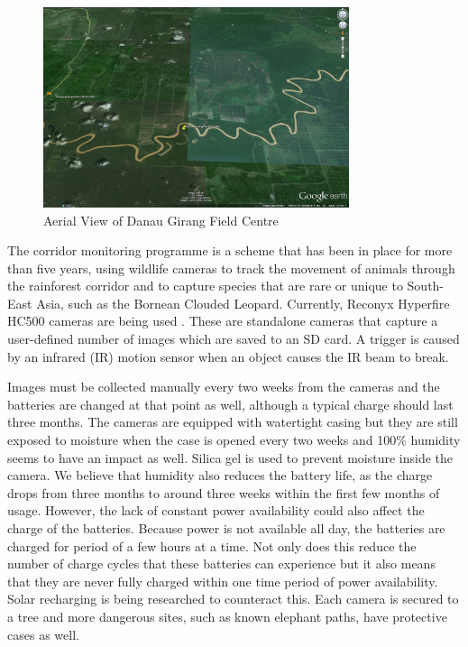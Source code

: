 		\begin{figure}[h]
		\centering
		\includegraphics[width=0.8\textwidth]{Chap3/figures/dgmap}
		\caption{Aerial View of Danau Girang Field Centre}
		\label{tech:fig:map}
		\end{figure}

The corridor monitoring programme is a scheme that has been in place for more than five years, using wildlife cameras to track the movement of animals through the rainforest corridor and to capture species that are rare or unique to South-East Asia, such as the Bornean Clouded Leopard. Currently, Reconyx Hyperfire HC500 cameras are being used \cite{Reconyx}. These are standalone cameras that capture a user-defined number of images which are saved to an SD card. A trigger is caused by an infrared (IR) motion sensor when an object causes the IR beam to break. 

Images must be collected manually every two weeks from the cameras and the batteries are changed at that point as well, although a typical charge should last three months. The cameras are equipped with watertight casing but they are still exposed to moisture when the case is opened every two weeks and 100\% humidity seems to have an impact as well. Silica gel is used to prevent moisture inside the camera. We believe that humidity also reduces the battery life, as the charge drops from three months to around three weeks within the first few months of usage. However, the lack of constant power availability could also affect the charge of the batteries. Because power is not available all day, the batteries are charged for period of a few hours at a time. Not only does this reduce the number of charge cycles that these batteries can experience but it also means that they are never fully charged within one time period of power availability. Solar recharging is being researched to counteract this. Each camera is secured to a tree and more dangerous sites, such as known elephant paths, have protective cases as well. 

